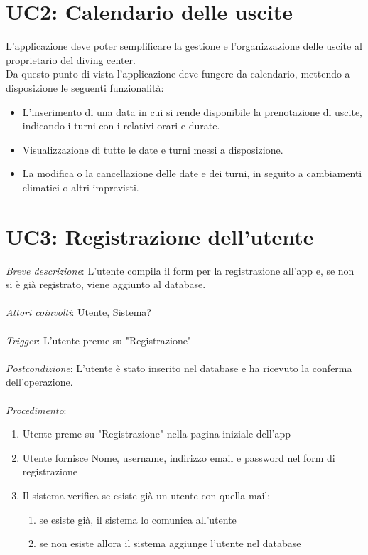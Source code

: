\section{UC2: Calendario delle uscite}
L'applicazione deve poter semplificare la gestione e l'organizzazione delle uscite al proprietario del diving center.
\\Da questo punto di vista l'applicazione deve fungere da calendario, mettendo a disposizione le seguenti funzionalità:

\begin{itemize}
    \item L'inserimento di una data in cui si rende disponibile la prenotazione di uscite, indicando i turni con i relativi orari e durate.
    \item Visualizzazione di tutte le date e turni messi a disposizione.
    \item La modifica o la cancellazione delle date e dei turni, in seguito a cambiamenti climatici o altri imprevisti.
\end{itemize}

\section{UC3: Registrazione dell'utente}
\emph{Breve descrizione}: L'utente compila il form per la registrazione all'app e, se non si è già registrato, viene aggiunto al database.\\\\
\emph{Attori coinvolti}: Utente, Sistema?\\\\
\emph{Trigger}: L'utente preme su "Registrazione"\\\\
\emph{Postcondizione}: L'utente è stato inserito nel database e ha ricevuto la conferma dell'operazione.\\\\
\emph{Procedimento}:
\begin{enumerate}
	\item Utente preme su "Registrazione" nella pagina iniziale dell'app
	\item Utente fornisce Nome, username, indirizzo email e password nel form di registrazione
	\item Il sistema verifica se esiste già un utente con quella mail:
		\begin{enumerate}
		     \item se esiste già, il sistema lo comunica all'utente
		     \item se non esiste allora il sistema aggiunge l'utente nel database
		\end{enumerate}
\end{enumerate}

